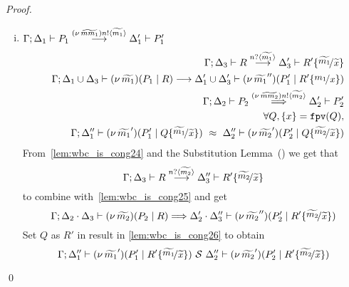 \begin{proof}
\begin{enumerate}
\begin{enumerate}[i.]
				\item
						$\Gamma; \Delta_1 \vdash P_1 \stackrel{(\nu\, \widetilde{mm_1}) n ! \langle \widetilde{m_1} \rangle}{\longrightarrow} \Delta_1' \vdash P_1'$
						\begin{eqnarray}
							& & \horel{\Gamma}{\Delta_3}{R}
							{\by{\bactinp{n}{\widetilde{m_1}}}}
							{\Delta_3'}{R' \subst{\widetilde{m_1}}{\widetilde{x}}}
							\label{lem:wbc_is_cong24}\\
							& & \horel{\Gamma}{\Delta_1 \cup \Delta_3}{\newsp{\widetilde{m_1}}{P_1 \Par R}}
							{\by{}}
							{\Delta_1' \cup \Delta_3'}{\newsp{\widetilde{m_1}''}{P_1' \Par R' \subst{m_1}{x}}}
							\nonumber \\
							& & \horel{\Gamma}{\Delta_2}{P_2}
							{\By{\news{\widetilde{mm_2}} \bactout{n}{\widetilde{m_2}}}}
							{\Delta_2'}{P_2'}
							\label{lem:wbc_is_cong25}\\
							& & \forall Q, \set{x} = \fpv{Q}, \nonumber \\
							& & \horel{\Gamma}{\Delta_1''}{\newsp{\widetilde{m_1}'}{P_1' \Par Q \subst{\widetilde{m_1}}{\widetilde{x}}}}
							{\ \wbc\ }
							{\Delta_2''}{\newsp{\widetilde{m_2}'}{P_2' \Par Q \subst{\widetilde{m_2}}{\widetilde{x}}}}
							\label{lem:wbc_is_cong26}
						\end{eqnarray}
						From~\eqref{lem:wbc_is_cong24} and the Substitution Lemma~() we get that
						\[
							\horel{\Gamma}{\Delta_3}{R}{\by{\bactinp{n}{\widetilde{m_2}}}}{\Delta_3''}{R' \subst{\widetilde{m_2}}{\widetilde{x}}}
						\]
						\noi to combine with~\eqref{lem:wbc_is_cong25} and get
						\[
							\horel{\Gamma}{\Delta_2 \cat \Delta_3}{\newsp{\widetilde{m_2}}{P_2 \Par R}}
							{\By{}}
							{\Delta_2' \cat \Delta_3''}{\newsp{\widetilde{m_2}''}{P_2' \Par R' \subst{\widetilde{m_2}}{\widetilde{x}}}}
						\]
						\noi Set $Q$ as $R'$ in result in \eqref{lem:wbc_is_cong26} to obtain
						\[
							\horel{\Gamma}{\Delta_1''}{\newsp{\widetilde{m_1}'}{P_1' \Par R' \subst{\widetilde{m_1}}{\widetilde{x}}}}
							{\ \mathcal{S}\ }
							{\Delta_2''}{\newsp{\widetilde{m_2}'}{P_2' \Par R' \subst{\widetilde{m_2}}{\widetilde{x}}}}
						\]
		\end{enumerate}
	\end{enumerate}
	\qed
\end{proof}



